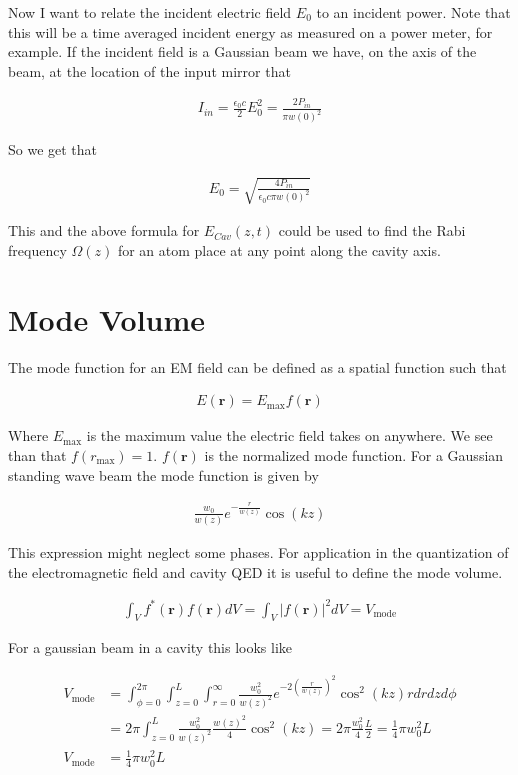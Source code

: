 \documentclass[12pt]{article}
\newcommand{\bv}[1]{\boldsymbol{#1}}
\begin{document}
Now I want to relate the incident electric field $E_0$ to an incident power. Note that this will be a time averaged incident energy as measured on a power meter, for example.
If the incident field is a Gaussian beam we have, on the axis of the beam, at the location of the input mirror that

\begin{align}
I_{in} = \frac{\epsilon_0 c}{2} E_0^2 =  \frac{2 P_{in}}{\pi w(0)^2}
\end{align}

So we get that

\begin{align}
E_0 = \sqrt{\frac{4 P_{in}}{\epsilon_0 c \pi w(0)^2}}
\end{align}


This and the above formula for $E_{Cav}(z,t)$ could be used to find the Rabi frequency $\Omega(z)$ for an atom place at any point along the cavity axis.

\section{Mode Volume}

The mode function for an EM field can be defined as a spatial function such that

\begin{align}
E(\bv{r}) = E_{\text{max}}f(\bv{r})	
\end{align}

Where $E_{\text{max}}$ is the maximum value the electric field takes on anywhere. We see than that $f(r_{\text{max}})=1$. $f(\bv{r})$ is the normalized mode function. For a Gaussian standing wave beam the mode function is given by

\begin{align}
\frac{w_0}{w(z)} e^{-\frac{r}{w(z)}} \cos(kz)
\end{align}

This expression might neglect some phases.
For application in the quantization of the electromagnetic field and cavity QED it is useful to define the mode volume.

\begin{align}
\int_{V} f^*(\bv{r})f(\bv{r}) dV = \int_V |f(\bv{r})|^2 dV	= V_{\text{mode}}
\end{align}

For a gaussian beam in a cavity this looks like

\begin{align}
V_{\text{mode}} &= \int_{\phi=0}^{2\pi} \int_{z=0}^L	\int_{r=0}^{\infty} \frac{w_0^2}{w(z)^2} e^{-2\left(\frac{r}{w(z)}\right)^2} \cos^2(kz) r dr dz d\phi\\
&= 2\pi \int_{z=0}^L \frac{w_0^2}{w(z)^2} \frac{w(z)^2}{4} \cos^2(kz) = 2\pi \frac{w_0^2}{4} \frac{L}{2} = \frac{1}{4} \pi w_0^2 L\\
V_{\text{mode}} &= \frac{1}{4} \pi w_0^2 L
\end{align}
\end{document}
